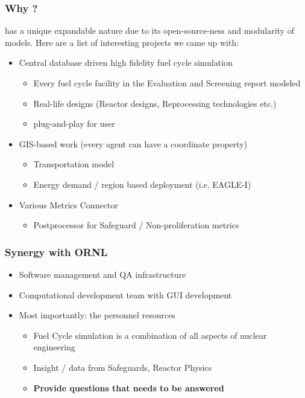 \begin{frame}
    \frametitle{Why \Cyclus?}
    \Cyclus has a unique expandable nature due to its open-source-ness and
    modularity of models. Here are a list of interesting projects we came up with:
    \begin{itemize}
        \item Central database driven high fidelity fuel cycle simulation
        \begin{itemize}
            \item Every fuel cycle facility in the Evaluation and Screening report modeled
            \item Real-life designs (Reactor designs, Reprocessing technologies etc.)
            \item plug-and-play for user
        \end{itemize}
        \item GIS-based work (every agent can have a coordinate property)
        \begin{itemize}
            \item Transportation model
            \item Energy demand / region based deployment (i.e. EAGLE-I)
        \end{itemize}
        \item Various Metrics Connector
        \begin{itemize}
        	\item Postprocessor for Safeguard / Non-proliferation metrics
        \end{itemize}
    \end{itemize}
\end{frame}


\begin{frame}
	\frametitle{Synergy with ORNL}
	\begin{itemize}
		\item Software management and QA infrastructure
		\item Computational development team with GUI development
		\item Most importantly: the personnel resources
		\begin{itemize}
			\item Fuel Cycle simulation is a combination of all aspects of nuclear engineering
			\item Insight / data from Safeguards, Reactor Physics 
			\item \textbf{Provide questions that needs to be answered}
		\end{itemize}
	\end{itemize}
\end{frame}


